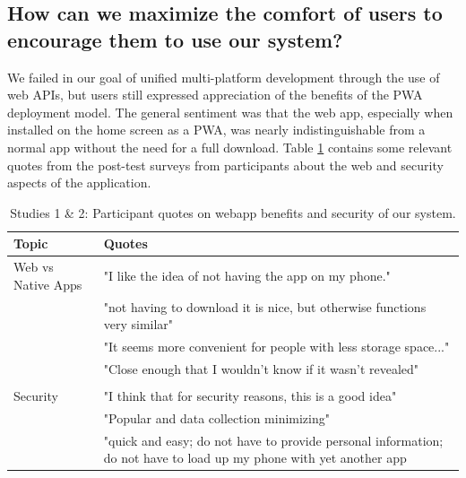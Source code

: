 \documentclass[thesis]{fputhesis}
\newcommand{\ra}[1]{\renewcommand{\arraystretch}{#1}}
\begin{document}
\begin{body}
\subsection{How can we maximize the comfort of users to encourage them to use our system?}
We failed in our goal of unified multi-platform development through the use of web APIs, but users still expressed appreciation of the benefits of the PWA deployment model. The general sentiment was that the web app, especially when installed on the home screen as a PWA, was nearly indistinguishable from a normal app without the need for a full download. Table \ref{tab:sec-responses} contains some relevant quotes from the post-test surveys from participants about the web and security aspects of the application. 

\begin{table}[h]\centering
\caption{Studies 1 \& 2: Participant quotes on webapp benefits and security of our system.}\label{tab:sec-responses}
\ra{1.2}
        \begin{tabular}{@{}l >{\raggedright\arraybackslash}p{} @{}}
            \toprule
                \textbf{Topic}  &   \textbf{Quotes} \\
            \midrule
                    Web vs Native Apps & "I like the idea of not having the app on my phone."                      \\ 
                    & "not having to download it is nice, but otherwise functions very similar" \\ 
                    & "It seems more convenient for people with less storage space..."          \\ 
                    & "Close enough that I wouldn't know if it wasn't revealed" \\
                    \\
                    Security & "I think that for security reasons, this is a good idea"                  \\  
                    & "Popular and data collection minimizing"                                  \\  
                    &  "quick and easy; do not have to provide personal information; do not have to load up my phone with yet another app \\
            \bottomrule
        \end{tabular}%
\end{table}


\end{body}
\end{document}
